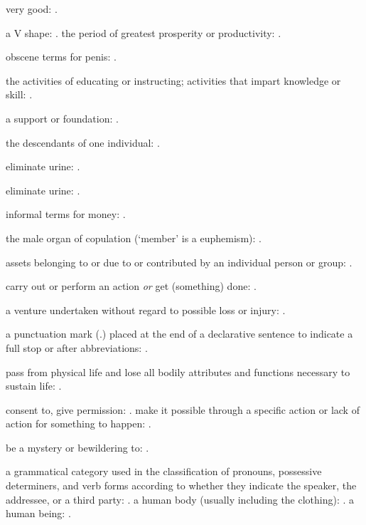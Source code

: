   very good: .

  a V shape: . the period of greatest prosperity or productivity: .

  obscene terms for penis: .

  the activities of educating or instructing; activities that impart knowledge or skill: .

  a support or foundation: .

  the descendants of one individual: .

  eliminate urine: .

  eliminate urine: .

  informal terms for money: .

  the male organ of copulation (`member' is a euphemism): .

  assets belonging to or due to or contributed by an individual person or group: .

  carry out or perform an action \textit{or} get (something) done: .

  a venture undertaken without regard to possible loss or injury: .

  a punctuation mark (.) placed at the end of a declarative sentence to indicate a full stop or after abbreviations: .

  pass from physical life and lose all bodily attributes and functions necessary to sustain life: .

  consent to, give permission: . make it possible through a specific action or lack of action for something to happen: .

  be a mystery or bewildering to: .

  a grammatical category used in the classification of pronouns, possessive determiners, and verb forms according to whether they indicate the speaker, the addressee, or a third party: . a human body (usually including the clothing): . a human being: .

